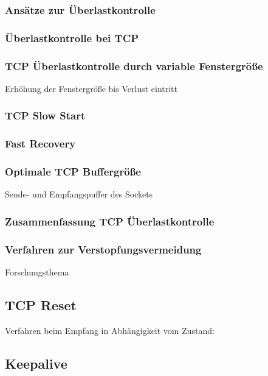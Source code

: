 \subsubsection{Ansätze zur Überlastkontrolle}
\subsubsection{Überlastkontrolle bei TCP}
\subsubsection{TCP Überlastkontrolle durch variable Fenstergröße}
Erhöhung der Fenstergröße bis Verlust eintritt
\subsubsection{TCP Slow Start}
\subsubsection{Fast Recovery}
\subsubsection{Optimale TCP Buffergröße}
Sende- und Empfangspuffer des Sockets
\subsubsection{Zusammenfassung TCP Überlastkontrolle}
\subsubsection{Verfahren zur Verstopfungsvermeidung}
Forschungsthema

\subsection{TCP Reset}
Verfahren beim Empfang in Abhängigkeit vom Zustand:

\subsection{Keepalive}

